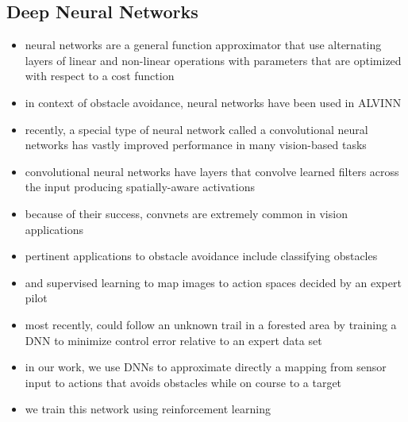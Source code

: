 \documentclass[paper=a4, fontsize=11pt]{scrartcl} %
\begin{document}
	\subsection{Deep Neural Networks}
	\begin{itemize}
		\item neural networks are a general function approximator that use alternating layers of linear and non-linear operations with parameters that are optimized with respect to a cost function
		\item in context of obstacle avoidance, neural networks have been used in ALVINN \cite{Pomerleau1989,Michels2005,riedmiller2009reinforcement}
		\item recently, a special type of neural network called a convolutional neural networks \cite{DBLP:journals/corr/SzegedyLJSRAEVR14} has vastly improved performance in many vision-based tasks
		\item convolutional neural networks have layers that convolve learned filters across the input producing spatially-aware activations
		\item because of their success, convnets are extremely common in vision applications
		\item pertinent applications to obstacle avoidance include classifying obstacles \cite{Hadsell2009}
		\item and supervised learning to map images to action spaces decided by an expert pilot \cite{Kim2015,Ross2013}
		\item most recently, \cite{Guisti2016} could follow an unknown trail in a forested area by training a DNN to minimize control error relative to an expert data set
		\item in our work, we use DNNs to approximate directly a mapping from sensor input to actions that avoids obstacles while on course to a target
		\item we train this network using reinforcement learning
	\end{itemize}
\end{document}
